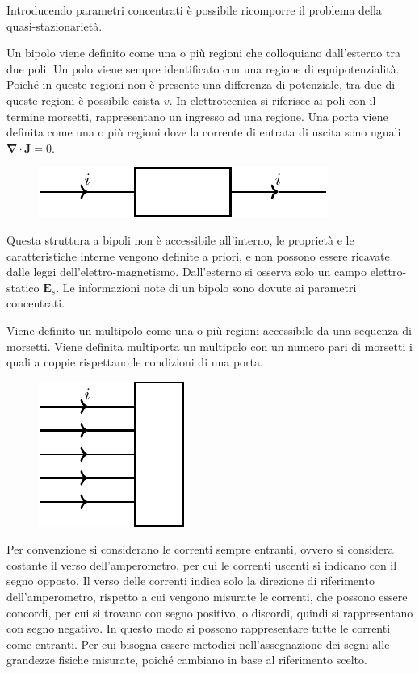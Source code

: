 \documentclass{article}
\newcommand{\vect}[1]{\boldsymbol{\mathbf{#1}}}
\numberwithin{equation}{subsection}
\begin{document}
Introducendo parametri concentrati è possibile ricomporre il problema della quasi-stazionarietà. 

Un bipolo viene definito come una o più regioni che colloquiano dall'esterno tra due poli. Un polo viene sempre identificato con una regione di equipotenzialità. Poiché in 
queste regioni non è presente una differenza di potenziale, tra due di queste regioni è possibile esista $v$. In elettrotecnica si riferisce ai poli con il termine morsetti, 
rappresentano un ingresso ad una regione. Una porta viene definita come una o più regioni dove la corrente di entrata di uscita sono uguali $\vect\nabla\cdot\vect{J}=0$.

\begin{figure}[H]%
    \centering
    \includegraphics{bipolo.pdf}%
    \label{fig:bipolo-porta}
\end{figure}
Questa struttura a bipoli non è accessibile all'interno, le proprietà e le caratteristiche interne vengono definite a priori, e non possono essere ricavate dalle leggi 
dell'elettro-magnetismo. Dall'esterno si osserva solo un campo elettro-statico $\vect{E}_s$. Le informazioni note di un bipolo sono dovute ai parametri concentrati. 

Viene definito un multipolo come una o più regioni accessibile da una sequenza di morsetti. Viene definita multiporta un multipolo con un numero pari di morsetti i quali 
a coppie rispettano le condizioni di una porta. 

\begin{figure}[H]%
    \centering
    \includegraphics{multiporta.pdf}%
    \label{fig:multiporta}
\end{figure}

Per convenzione si considerano le correnti sempre entranti, ovvero si considera costante il verso dell'amperometro, per cui le correnti uscenti si indicano con il segno 
opposto. Il verso delle correnti indica solo la direzione di riferimento dell'amperometro, rispetto a cui vengono misurate le correnti, che possono essere concordi, per cui 
si trovano con segno positivo, o discordi, quindi si rappresentano con segno negativo. In questo modo si possono rappresentare tutte le correnti come entranti. Per cui bisogna 
essere metodici nell'assegnazione dei segni alle grandezze fisiche misurate, poiché cambiano in base al riferimento scelto. 
\end{document}
